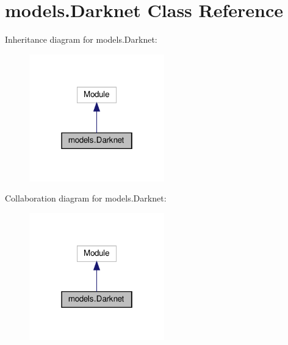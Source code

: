 \hypertarget{classmodels_1_1Darknet}{}\section{models.\+Darknet Class Reference}
\label{classmodels_1_1Darknet}


Inheritance diagram for models.\+Darknet\+:
\nopagebreak
\begin{figure}[H]
\begin{center}
\leavevmode
\includegraphics[width=166pt]{classmodels_1_1Darknet__inherit__graph}
\end{center}
\end{figure}


Collaboration diagram for models.\+Darknet\+:
\nopagebreak
\begin{figure}[H]
\begin{center}
\leavevmode
\includegraphics[width=166pt]{classmodels_1_1Darknet__coll__graph}
\end{center}
\end{figure}

